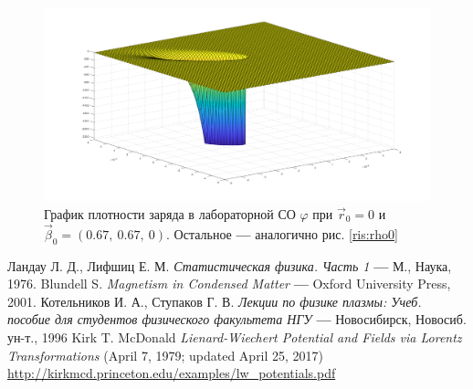 \documentclass[oneside,final,14pt]{extarticle}
\begin{document}
\begin{figure}
\centering
\includegraphics[scale=0.36]{diagspd095orig.png}
\caption{График плотности заряда в лабораторной СО $\varphi$ при $\vec r_{0}=0$ и $\vec \beta_0 = (0.67, \ 0.67, \ 0)$. Остальное \textbf{---} аналогично рис. \ref{ris:rho0}}
\label{ris:rho095diag}
\end{figure}

	\newpage
	\begin{thebibliography}{0}
		 Ландау Л. Д., Лифшиц Е. М. \textit{Статистическая физика. Часть 1} \textbf{---} М., Наука, 1976.
		 Blundell S. \textit{Magnetism in Condensed Matter} \textbf{---} Oxford University Press, 2001.
		 Котельников И. А., Ступаков Г. В. \textit{Лекции по физике плазмы: Учеб. пособие для студентов физического факультета НГУ} \textbf{---} Новосибирск, Новосиб. ун-т., 1996
		 Kirk T. McDonald \textit{Lienard-Wiechert Potential and Fields via Lorentz Transformations} (April 7, 1979; updated April 25, 2017) \\ \url{http://kirkmcd.princeton.edu/examples/lw_potentials.pdf}
	\end{thebibliography}
\end{document}
